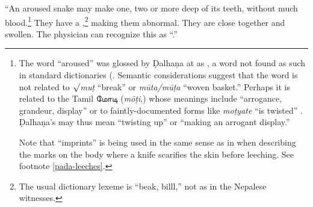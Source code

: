 \begin{translation}
“An aroused snake may make one, two or more deep  of its
teeth, without much blood.\footnote{\label{pada-snakes} The word
     “aroused” was glossed by Ḍalhaṇa at  as
    , a word not found as such in standard dictionaries
    (\cite{moni-sans,apte-prac,mayr-kurz,josi-maha}. Semantic considerations
    suggest that the word is not related to $\surd$\emph{muṭ} “break” or
    \emph{mūta/mūṭa} “woven basket.” Perhaps it is related to the Tamil
    \texttamil{மோடி} (\emph{mōṭi},) whose meanings include “arrogance, grandeur,
    display” \citep[\#5133]{burr-1984} or to faintly-documented forms like
    \emph{moṭyate} “is twisted” \citep[\#10186]{CDIAL}. Ḍalhaṇa's 
    may thus mean “twisting up” or “making an arrogant display.” \par Note that
     “imprints” is being used in the same sense as in 
    when describing the marks on the body where a knife scarifies the skin
    before leeching. See footnote \ref{pada-leeches}.} They have a
    ,\footnote{The usual
        dictionary lexeme is  “beak, billl,” not  as in the
        Nepalese witnesses.} making them abnormal. They are close together and
        swollen.  The physician can recognize this as “.”

    
\end{translation}